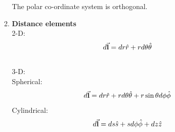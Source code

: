 \documentclass[12pt, oneside]{book}
\begin{document}
\begin{itemize}
\begin{enumerate}
The polar co-ordinate system is orthogonal.
   \item \textbf{Distance elements}\\
   2-D: \begin{equation}
   	d\va{\textbf{l}}=dr\hat{r}+rd\theta\hat{\theta}
   \end{equation}\\
   3-D: \\
   Spherical:\\
   \begin{equation}
   	d\va{\textbf{l}}=dr\hat{r}+rd\theta\hat{\theta}+r\sin\theta d\phi \hat{\phi}
   \end{equation}
Cylindrical:\\
   \begin{equation}
   	d\va{\textbf{l}}=ds\hat{s}+sd\phi\hat{\phi}+ dz \hat{z}
   \end{equation}


\end{enumerate}
\end{itemize}
\end{document}
